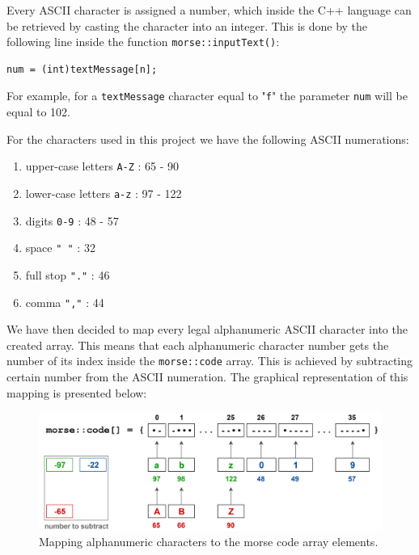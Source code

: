 \documentclass[12pt]{report}
\begin{document}
Every ASCII character is assigned a number, which inside the C++ language can be retrieved by casting the character into an integer. This is done by the following line inside the function \verb|morse::inputText()|: 

\begin{lstlisting}
num = (int)textMessage[n];
\end{lstlisting}

For example, for a \verb|textMessage| character equal to "\verb|f|" the parameter \verb|num| will be equal to 102.

For the characters used in this project we have the following ASCII numerations:

\begin{enumerate}

\item upper-case letters \verb|A-Z| : 65 - 90

\item lower-case letters \verb|a-z| : 97 - 122

\item digits \verb|0-9| : 48 - 57

\item space \verb|" "| : 32

\item full stop \verb|"."| : 46

\item comma \verb|","| : 44

\end{enumerate}


We have then decided to map every legal alphanumeric ASCII character into the created array. This means that each alphanumeric character number gets the number of its index inside the \verb|morse::code| array. This is achieved by subtracting certain number from the ASCII numeration. The graphical representation of this mapping is presented below:

\begin{figure}[H]
\centering\includegraphics[scale=0.1]{morse_code_map}
\caption{Mapping alphanumeric characters to the morse code array elements.}				
\label{fig:morse_code_map}
\end{figure}
\end{document}
